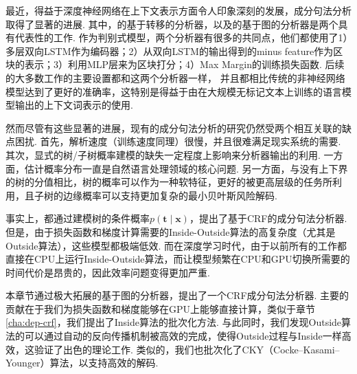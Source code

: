 最近，得益于深度神经网络在上下文表示方面令人印象深刻的发展，成分句法分析取得了显著的进展.
其中，\cite{cross-huang-2016-span}的基于转移的分析器，以及\cite{stern-etal-2017-minimal}的基于图的分析器是两个具有代表性的工作.
作为判别式模型，两个分析器有很多的共同点，他们都使用了1）多层双向LSTM作为编码器；2）从双向LSTM的输出得到的minus feature作为区块的表示；3）利用MLP层来为区块打分；4）Max Margin的训练损失函数.
后续的大多数工作\citep{gaddy-etal-2018-whats,kitaev-klein-2018-constituency}的主要设置都和这两个分析器一样， 并且都相比传统的非神经网络模型达到了更好的准确率，这特别是得益于由在大规模无标记文本上训练的语言模型输出的上下文词表示的使用\citep{peters-etal-2018-deep,devlin-etal-2019-bert}.

然而尽管有这些显著的进展，现有的成分句法分析的研究仍然受两个相互关联的缺点困扰.
首先，解析速度（训练速度同理）很慢，并且很难满足现实系统的需要.
其次，显式的树/子树概率建模的缺失一定程度上影响来分析器输出的利用.
一方面，估计概率分布一直是自然语言处理领域的核心问题\citep{le-zuidema-2014-inside}.
另一方面，与没有上下界的树的分值相比，树的概率可以作为一种软特征，更好的被更高层级的任务所利用\citep{jin-etal-2020-relation}，且子树的边缘概率可以支持更加复杂的最小贝叶斯风险解码\citep{smith-smith-2007-probabilistic}.

事实上，\cite{finkel-etal-2008-efficient,durrett-klein-2015-neural}都通过建模树的条件概率$p(\boldsymbol{t}\mid\boldsymbol{x})$，提出了基于CRF\citep{lafferty-etal-2001-crf}的成分句法分析器.
但是，由于损失函数和梯度计算需要的Inside-Outside算法的高复杂度（尤其是Outside算法），这些模型都极端低效.
而在深度学习时代，由于以前所有的工作都直接在CPU上运行Inside-Outside算法，而让模型频繁在CPU和GPU切换所需要的时间代价是昂贵的，因此效率问题变得更加严重.

本章节通过极大拓展\cite{stern-etal-2017-minimal}的基于图的分析器，提出了一个CRF成分句法分析器.
主要的贡献在于我们为损失函数和梯度能够在GPU上能够直接计算，类似于章节\ref{cha:dep-crf}，我们提出了Inside算法的批次化方法.
与此同时，我们发现Outside算法的可以通过自动的反向传播机制被高效的完成，使得Outside过程与Inside一样高效，这验证了\cite{eisner-2016-inside}出色的理论工作.
类似的，我们也批次化了CKY（Cocke–Kasami–Younger）算法，以支持高效的解码.

